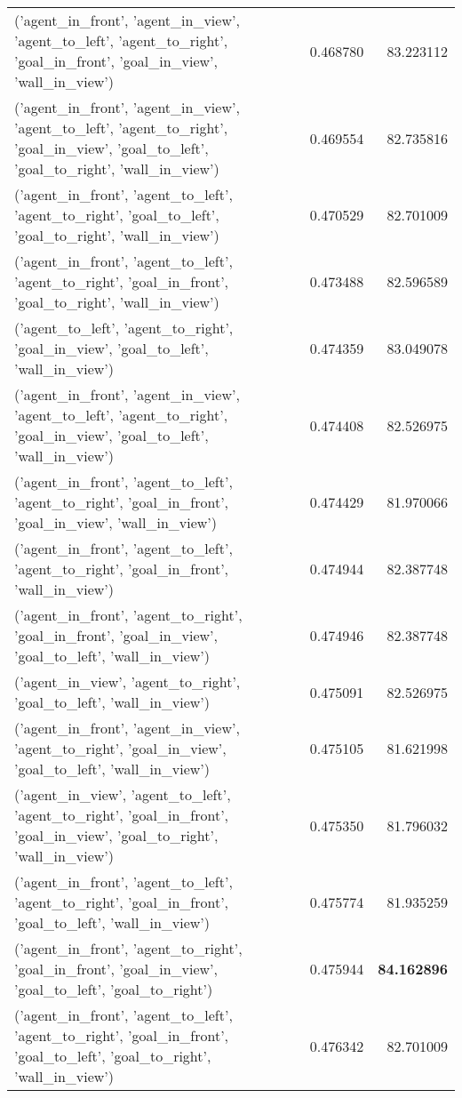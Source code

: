 \begin{tabular}{lrr}
('agent\_in\_front', 'agent\_in\_view', 'agent\_to\_left', 'agent\_to\_right', 'goal\_in\_front', 'goal\_in\_view', 'wall\_in\_view') & 0.468780 & 83.223112 \\
('agent\_in\_front', 'agent\_in\_view', 'agent\_to\_left', 'agent\_to\_right', 'goal\_in\_view', 'goal\_to\_left', 'goal\_to\_right', 'wall\_in\_view') & 0.469554 & 82.735816 \\
('agent\_in\_front', 'agent\_to\_left', 'agent\_to\_right', 'goal\_to\_left', 'goal\_to\_right', 'wall\_in\_view') & 0.470529 & 82.701009 \\
('agent\_in\_front', 'agent\_to\_left', 'agent\_to\_right', 'goal\_in\_front', 'goal\_to\_right', 'wall\_in\_view') & 0.473488 & 82.596589 \\
('agent\_to\_left', 'agent\_to\_right', 'goal\_in\_view', 'goal\_to\_left', 'wall\_in\_view') & 0.474359 & 83.049078 \\
('agent\_in\_front', 'agent\_in\_view', 'agent\_to\_left', 'agent\_to\_right', 'goal\_in\_view', 'goal\_to\_left', 'wall\_in\_view') & 0.474408 & 82.526975 \\
('agent\_in\_front', 'agent\_to\_left', 'agent\_to\_right', 'goal\_in\_front', 'goal\_in\_view', 'wall\_in\_view') & 0.474429 & 81.970066 \\
('agent\_in\_front', 'agent\_to\_left', 'agent\_to\_right', 'goal\_in\_front', 'wall\_in\_view') & 0.474944 & 82.387748 \\
('agent\_in\_front', 'agent\_to\_right', 'goal\_in\_front', 'goal\_in\_view', 'goal\_to\_left', 'wall\_in\_view') & 0.474946 & 82.387748 \\
('agent\_in\_view', 'agent\_to\_right', 'goal\_to\_left', 'wall\_in\_view') & 0.475091 & 82.526975 \\
('agent\_in\_front', 'agent\_in\_view', 'agent\_to\_right', 'goal\_in\_view', 'goal\_to\_left', 'wall\_in\_view') & 0.475105 & 81.621998 \\
('agent\_in\_view', 'agent\_to\_left', 'agent\_to\_right', 'goal\_in\_front', 'goal\_in\_view', 'goal\_to\_right', 'wall\_in\_view') & 0.475350 & 81.796032 \\
('agent\_in\_front', 'agent\_to\_left', 'agent\_to\_right', 'goal\_in\_front', 'goal\_to\_left', 'wall\_in\_view') & 0.475774 & 81.935259 \\
('agent\_in\_front', 'agent\_to\_right', 'goal\_in\_front', 'goal\_in\_view', 'goal\_to\_left', 'goal\_to\_right') & 0.475944 & \color{f_green} \bfseries 84.162896 \\
('agent\_in\_front', 'agent\_to\_left', 'agent\_to\_right', 'goal\_in\_front', 'goal\_to\_left', 'goal\_to\_right', 'wall\_in\_view') & 0.476342 & 82.701009 \\

\end{tabular}
